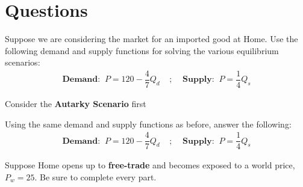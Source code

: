 \documentclass[12pt]{exam}
\begin{document}
\section*{Questions}
\begin{questions}

\question
Suppose we are considering the market for an imported good at Home. 
Use the following demand and supply functions for solving the various equilibrium scenarios:
\begin{align*}
    \textbf{Demand:} \;\; P = 120 - \dfrac{4}{7}Q_{d} \;\;\;\; ; \;\;\;\; \textbf{Supply:} \;\; P = \dfrac{1}{4}Q_{s}
\end{align*}

Consider the \textbf{Autarky Scenario} first


\newpage 

\question
Using the same demand and supply functions as before, answer the following:
\begin{align*}
    \textbf{Demand:} \;\; P = 120 - \dfrac{4}{7}Q_{d} \;\;\;\; ; \;\;\;\; \textbf{Supply:} \;\; P = \dfrac{1}{4}Q_{s}
\end{align*}

Suppose Home opens up to \textbf{free-trade} and becomes exposed to a world price, $P_{w} = 25$.
Be sure to complete every part.
\begin{parts}

\end{parts}
\end{questions}
\end{document}
